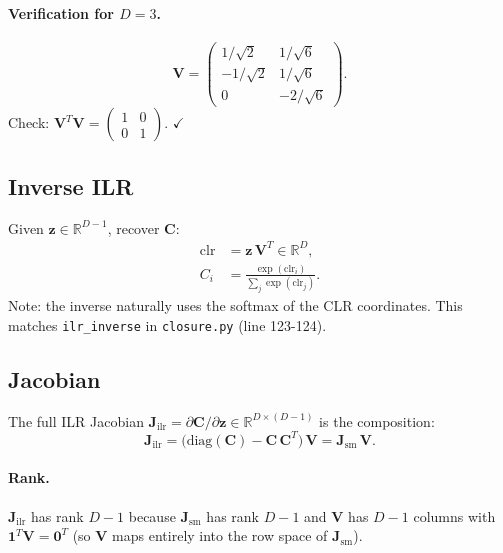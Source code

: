 \documentclass[11pt]{article}
\newcommand{\CC}{\mathbf{C}}
\newcommand{\zz}{\mathbf{z}}
\newcommand{\JJ}{\mathbf{J}}
\newcommand{\VV}{\mathbf{V}}
\newcommand{\ones}{\mathbf{1}}
\begin{document}
\paragraph{Verification for $D = 3$.}
%
\begin{equation}
  \VV = \begin{pmatrix}
    1/\sqrt{2} & 1/\sqrt{6} \\
    -1/\sqrt{2} & 1/\sqrt{6} \\
    0 & -2/\sqrt{6}
  \end{pmatrix}.
\end{equation}
%
Check: $\VV^T\VV = \begin{pmatrix} 1 & 0 \\ 0 & 1 \end{pmatrix}$. $\checkmark$

\subsection{Inverse ILR}

Given $\zz \in \mathbb{R}^{D-1}$, recover $\CC$:
%
\begin{align}
  \mathrm{clr} &= \zz\,\VV^T \in \mathbb{R}^D, \label{eq:ilr-inv-clr}\\
  C_i &= \frac{\exp(\mathrm{clr}_i)}{\sum_j \exp(\mathrm{clr}_j)}.
  \label{eq:ilr-inv}
\end{align}
%
Note: the inverse naturally uses the softmax of the CLR coordinates.
This matches \texttt{ilr\_inverse} in \texttt{closure.py} (line 123-124).

\subsection{Jacobian}

The full ILR Jacobian $\JJ_\mathrm{ilr} = \partial \CC / \partial \zz
\in \mathbb{R}^{D \times (D-1)}$ is the composition:
%
\begin{equation}
  \label{eq:ilr-jacobian}
  \boxed{
    \JJ_\mathrm{ilr}
    = \bigl(\mathrm{diag}(\CC) - \CC\,\CC^T\bigr)\,\VV
    = \JJ_\mathrm{sm}\,\VV.
  }
\end{equation}
%


\paragraph{Rank.}
$\JJ_\mathrm{ilr}$ has rank $D-1$ because $\JJ_\mathrm{sm}$ has rank
$D-1$ and $\VV$ has $D-1$ columns with $\ones^T\VV = \mathbf{0}^T$
(so $\VV$ maps entirely into the row space of $\JJ_\mathrm{sm}$).
\end{document}
